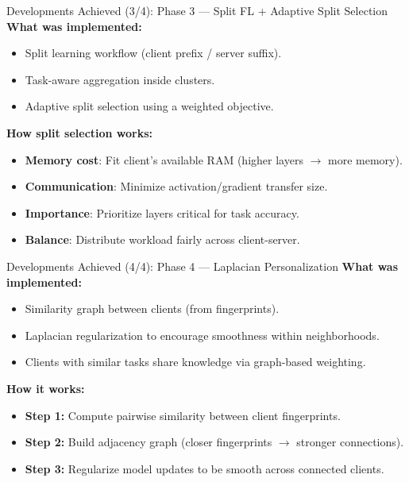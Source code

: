 \documentclass[aspectratio=169]{beamer}
\begin{document}
\begin{frame}{Developments Achieved (3/4): Phase 3 --- Split FL + Adaptive Split Selection}
\textbf{What was implemented:}
\begin{itemize}
  \item Split learning workflow (client prefix / server suffix).
  \item Task-aware aggregation inside clusters.
  \item Adaptive split selection using a weighted objective.
\end{itemize}

\vspace{0.3cm}
\textbf{How split selection works:}
\begin{itemize}
  \item \textbf{Memory cost}: Fit client's available RAM (higher layers $\rightarrow$ more memory).
  \item \textbf{Communication}: Minimize activation/gradient transfer size.
  \item \textbf{Importance}: Prioritize layers critical for task accuracy.
  \item \textbf{Balance}: Distribute workload fairly across client-server.
\end{itemize}

\end{frame}


\begin{frame}{Developments Achieved (4/4): Phase 4 --- Laplacian Personalization}
\textbf{What was implemented:}
\begin{itemize}
  \item Similarity graph between clients (from fingerprints).
  \item Laplacian regularization to encourage smoothness within neighborhoods.
  \item Clients with similar tasks share knowledge via graph-based weighting.
\end{itemize}

\vspace{0.3cm}
\textbf{How it works:}
\begin{itemize}
  \item \textbf{Step 1:} Compute pairwise similarity between client fingerprints.
  \item \textbf{Step 2:} Build adjacency graph (closer fingerprints $\rightarrow$ stronger connections).
  \item \textbf{Step 3:} Regularize model updates to be smooth across connected clients.
\end{itemize}

\end{frame}
\end{document}
